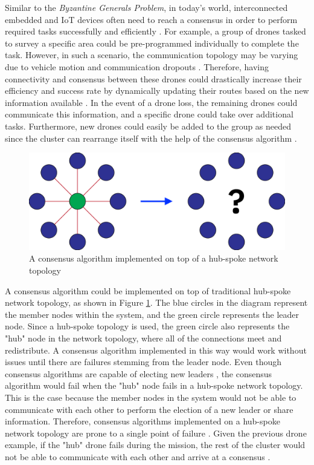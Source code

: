 Similar to the \textit{Byzantine Generals Problem}, in today's world, interconnected embedded and IoT devices often need to reach a consensus in order to perform required tasks successfully and efficiently \cite{Orostica_Nunez_2019}. For example, a group of drones tasked to survey a specific area could be pre-programmed individually to complete the task. However, in such a scenario, the communication topology may be varying due to vehicle motion and communication dropouts \cite{moreau2004stability} \cite{munoz2017adaptive}. Therefore, having connectivity and consensus between these drones could drastically increase their efficiency and success rate by dynamically updating their routes based on the new information available \cite{ren2007information}. In the event of a drone loss, the remaining drones could communicate this information, and a specific drone could take over additional tasks. Furthermore, new drones could easily be added to the group as needed since the cluster can rearrange itself with the help of the consensus algorithm \cite{chen2020achieving}.




\begin{figure}[H]
    \centering
    \includegraphics[width=0.6\columnwidth]{images/consensus_traditional.png}
    \caption{A consensus algorithm implemented on top of a hub-spoke network topology}
    \label{fig:consensus_traditional}
\end{figure}

A consensus algorithm could be implemented on top of traditional hub-spoke network topology, as shown in Figure \ref{fig:consensus_traditional}. The blue circles in the diagram represent the member nodes within the system, and the green circle represents the leader node. Since a hub-spoke topology is used, the green circle also represents the "hub" node in the network topology, where all of the connections meet and redistribute. A consensus algorithm implemented in this way would work without issues until there are failures stemming from the leader node. Even though consensus algorithms are capable of electing new leaders \cite{raft_paper}, the consensus algorithm would fail when the "hub" node fails in a hub-spoke network topology. This is the case because the member nodes in the system would not be able to communicate with each other to perform the election of a new leader or share information. Therefore, consensus algorithms implemented on a hub-spoke network topology are prone to a single point of failure \cite{karatas2020multi}. Given the previous drone example, if the "hub" drone fails during the mission, the rest of the cluster would not be able to communicate with each other and arrive at a consensus \cite{ren2007information}.

